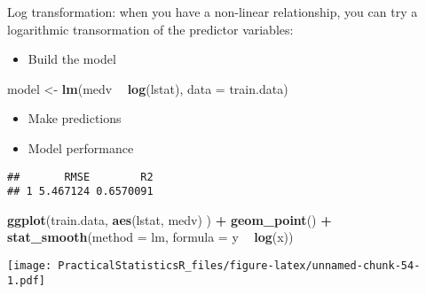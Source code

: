 \documentclass[]{article}
\newenvironment{Shaded}{\begin{snugshade}}{\end{snugshade}}
\newcommand{\DataTypeTok}[1]{\textcolor[rgb]{0.13,0.29,0.53}{#1}}
\newcommand{\KeywordTok}[1]{\textcolor[rgb]{0.13,0.29,0.53}{\textbf{#1}}}
\newcommand{\NormalTok}[1]{#1}
\newcommand{\OperatorTok}[1]{\textcolor[rgb]{0.81,0.36,0.00}{\textbf{#1}}}
\newcommand{\StringTok}[1]{\textcolor[rgb]{0.31,0.60,0.02}{#1}}
\providecommand{\tightlist}{%
  \setlength{\itemsep}{0pt}\setlength{\parskip}{0pt}}
\begin{document}
Log transformation: when you have a non-linear relationship, you can try
a logarithmic transormation of the predictor variables:

\begin{itemize}
\tightlist
\item
  Build the model
\end{itemize}

\begin{Shaded}
\begin{Highlighting}[]
\NormalTok{model <-}\StringTok{ }\KeywordTok{lm}\NormalTok{(medv }\OperatorTok{~}\StringTok{ }\KeywordTok{log}\NormalTok{(lstat), }\DataTypeTok{data =}\NormalTok{ train.data)}
\end{Highlighting}
\end{Shaded}

\begin{itemize}
\tightlist
\item
  Make predictions
\end{itemize}

\begin{Shaded}
\end{Shaded}

\begin{itemize}
\tightlist
\item
  Model performance
\end{itemize}

\begin{Shaded}
\end{Shaded}

\begin{verbatim}
##       RMSE        R2
## 1 5.467124 0.6570091
\end{verbatim}

\begin{Shaded}
\begin{Highlighting}[]
\KeywordTok{ggplot}\NormalTok{(train.data, }\KeywordTok{aes}\NormalTok{(lstat, medv) ) }\OperatorTok{+}
\StringTok{  }\KeywordTok{geom_point}\NormalTok{() }\OperatorTok{+}
\StringTok{  }\KeywordTok{stat_smooth}\NormalTok{(}\DataTypeTok{method =}\NormalTok{ lm, }\DataTypeTok{formula =}\NormalTok{ y }\OperatorTok{~}\StringTok{ }\KeywordTok{log}\NormalTok{(x))}
\end{Highlighting}
\end{Shaded}

\texttt{[image: PracticalStatisticsR\_files/figure-latex/unnamed-chunk-54-1.pdf]}
\end{document}
